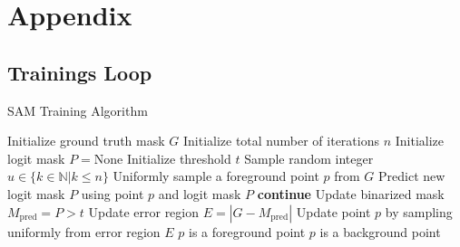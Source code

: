 \section{Appendix}
\subsection{Trainings Loop}\label{pcsam}
\begin{algorithm}
	\caption{SAM Training Algorithm}
	\begin{algorithmic}[1]
		\State Initialize ground truth mask $G$
		\State Initialize total number of iterations $n$
		\State Initialize logit mask $ P = \text{None}$
		\State Initialize threshold $t$
		\State Sample random integer $u\in \{k \in \mathbb{N}|k\leq n\}$
		\State Uniformly sample a foreground point $p$ from $G$
		\State Predict new logit mask $P$ using point $p$ and logit mask $P$
		\State \textbf{continue}
		\EndIf
		\State Update binarized mask $M_{\text{pred}} = P > t$ 
		\State Update error region $E = |G - M_{\text{pred}}|$
		\State Update point $p$ by sampling uniformly from error region $E$
		\State $p$ is a foreground point
		\State $p$ is a background point
		\EndIf
		\EndFor
	\end{algorithmic}
\end{algorithm}
